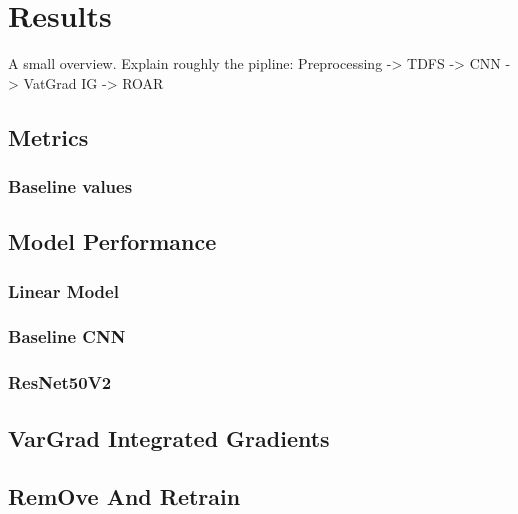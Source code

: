 \chapter{Results}
\label{ch:results}

A small overview. Explain roughly the pipline: Preprocessing -> TDFS -> CNN -> VatGrad IG -> ROAR

\section{Metrics}
\label{sec:results:metrics}

\subsection{Baseline values}
\label{sec:results:bl_values}

\section{Model Performance}
\label{sec:model_performance}

\subsection{Linear Model}
\label{sec:results:lm}

\subsection{Baseline CNN}
\label{sec:results:bl_cnn}

\subsection{ResNet50V2}
\label{sec:results:RN50V2}

\section{VarGrad Integrated Gradients}
\label{sec:results:VarGrad_IG}

\section{RemOve And Retrain}
\label{sec:results:ROAR}

